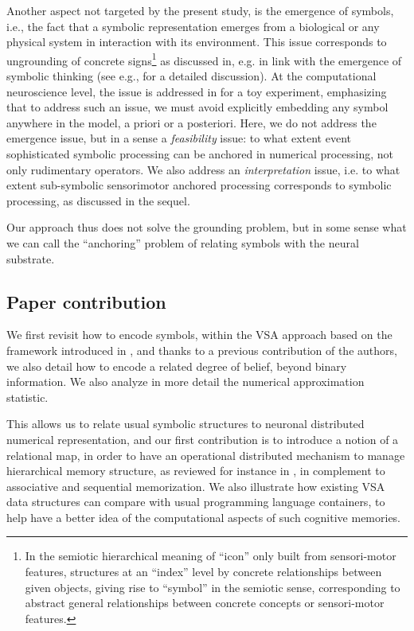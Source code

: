 \documentclass[sn-mathphys]{sn-jnl}
\begin{document}
Another aspect not targeted by the present study, is the emergence of symbols, i.e., the fact that a symbolic representation emerges from a biological or any physical system in interaction with its environment. This issue corresponds to ungrounding of concrete signs\footnote{In the semiotic hierarchical meaning of ``icon'' only built from sensori-motor features, structures at an ``index'' level by concrete relationships between given objects, giving rise to ``symbol'' in the semiotic sense, corresponding to abstract general relationships between concrete concepts or sensori-motor features.} as discussed in, e.g. \cite{raczaszek-leonardi_ungrounding_2018} in link with the emergence of symbolic thinking (see e.g., \cite{villiers_why_2007} for a detailed discussion). At the computational neuroscience level, the issue is addressed in \cite{rougier_implicit_2009} for a toy experiment, emphasizing that to address such an issue, we must avoid explicitly embedding any symbol anywhere in the model, a priori or a posteriori. Here, we do not address the emergence issue, but in a sense a {\em feasibility} issue: to what extent event sophisticated symbolic processing can be anchored in numerical processing, not only rudimentary operators. We also address an {\em interpretation} issue, i.e. to what extent sub-symbolic sensorimotor anchored processing corresponds to symbolic processing, as discussed in the sequel.

Our approach thus does not solve the grounding problem, but in some sense what we can call the ``anchoring'' problem of relating symbols with the neural substrate.

\subsection{Paper contribution}

We first revisit how to encode symbols, within the VSA approach based on the framework introduced in \cite{eliasmith_how_2013}, and thanks to a previous contribution of the authors, we also detail how to encode a related degree of belief, beyond binary information. We also analyze in more detail the numerical approximation statistic.

This allows us to relate usual symbolic structures to neuronal distributed numerical representation, and our first contribution is to introduce a notion of a relational map, in order to have an operational distributed mechanism to manage hierarchical memory structure, as reviewed for instance in \cite{eichenbaum_memory_2017}, in complement to associative and sequential memorization. We also illustrate how existing VSA data structures can compare with usual programming language containers, to help have a better idea of the computational aspects of such cognitive memories.
\end{document}
